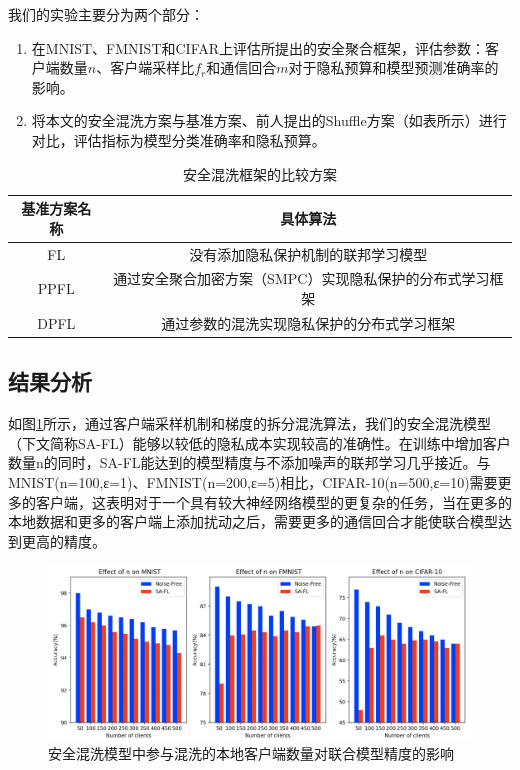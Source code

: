 我们的实验主要分为两个部分：
\begin{enumerate}
\item [(1)] 在MNIST、FMNIST和CIFAR上评估所提出的安全聚合框架，评估参数：客户端数量$n$、客户端采样比$f_{r}$和通信回合$m$对于隐私预算和模型预测准确率的影响。
\item [(2)] 将本文的安全混洗方案与基准方案、前人提出的Shuffle方案（如表所示）进行对比，评估指标为模型分类准确率和隐私预算。
\end{enumerate}

\begin{table}[H]
	\centering
	\begin{tabular}{cc}
		\hline
		基准方案名称& 具体算法\\
		\hline
		FL& 没有添加隐私保护机制的联邦学习模型\\
		PPFL\upcite{ref71}& 通过安全聚合加密方案（SMPC）实现隐私保护的分布式学习框架\\
		DPFL\upcite{ref67}& 通过参数的混洗实现隐私保护的分布式学习框架\\
		\hline
	\end{tabular}
	\caption{安全混洗框架的比较方案}
	\label{tab1}
\end{table}

\subsection{结果分析}

如图\ref{fig:安全混洗模型中参与混洗的本地客户端数量对联合模型精度的影响}所示，通过客户端采样机制和梯度的拆分混洗算法，我们的安全混洗模型（下文简称SA-FL）能够以较低的隐私成本实现较高的准确性。在训练中增加客户数量n的同时，SA-FL能达到的模型精度与不添加噪声的联邦学习几乎接近。与MNIST(n=100,ε=1)、FMNIST(n=200,ε=5)相比，CIFAR-10(n=500,ε=10)需要更多的客户端，这表明对于一个具有较大神经网络模型的更复杂的任务，当在更多的本地数据和更多的客户端上添加扰动之后，需要更多的通信回合才能使联合模型达到更高的精度。

\begin{figure}[!hbt]
\centering
  	\includegraphics[scale=0.37]{fig2/C4/SA-FL1}%
	\caption{安全混洗模型中参与混洗的本地客户端数量对联合模型精度的影响}
  	\label{fig:安全混洗模型中参与混洗的本地客户端数量对联合模型精度的影响} 
\end{figure}

